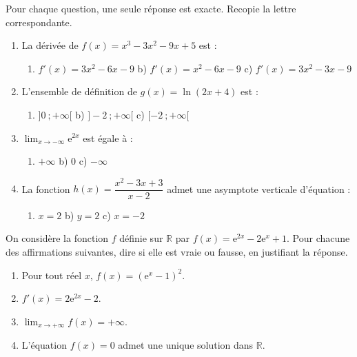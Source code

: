 \documentclass[11pt]{article}
\begin{document}
\begin{exercice}
Pour chaque question, une seule réponse est exacte. Recopie la lettre correspondante.
\begin{enumerate}
\item La dérivée de $f(x) = x^3 - 3x^2 - 9x + 5$ est :
\begin{enumerate}
\item[a)] $f'(x) = 3x^2 - 6x - 9$ \quad b) $f'(x) = x^2 - 6x - 9$ \quad c) $f'(x) = 3x^2 - 3x - 9$
\end{enumerate}
\item L'ensemble de définition de $g(x) = \ln(2x + 4)$ est :
\begin{enumerate}
\item[a)] $]0\ ; +\infty[$ \quad b) $]-2\ ; +\infty[$ \quad c) $[-2\ ; +\infty[$
\end{enumerate}
\item $\displaystyle\lim_{x \to -\infty} \mathrm{e}^{2x}$ est égale à :
\begin{enumerate}
\item[a)] $+\infty$ \quad b) $0$ \quad c) $-\infty$
\end{enumerate}
\item La fonction $h(x) = \dfrac{x^2 - 3x + 3}{x - 2}$ admet une asymptote verticale d'équation :
\begin{enumerate}
\item[a)] $x = 2$ \quad b) $y = 2$ \quad c) $x = -2$
\end{enumerate}
\end{enumerate}
\end{exercice}

\begin{exercice}
On considère la fonction $f$ définie sur $\mathbb{R}$ par $f(x) = \mathrm{e}^{2x} - 2\mathrm{e}^x + 1$. Pour chacune des affirmations suivantes, dire si elle est vraie ou fausse, en justifiant la réponse.
\begin{enumerate}
\item Pour tout réel $x$, $f(x) = \left(\mathrm{e}^x - 1\right)^2$.
\item $f'(x) = 2\mathrm{e}^{2x} - 2$.
\item $\displaystyle\lim_{x \to +\infty} f(x) = +\infty$.
\item L'équation $f(x) = 0$ admet une unique solution dans $\mathbb{R}$.
\end{enumerate}
\end{exercice}
\end{document}
